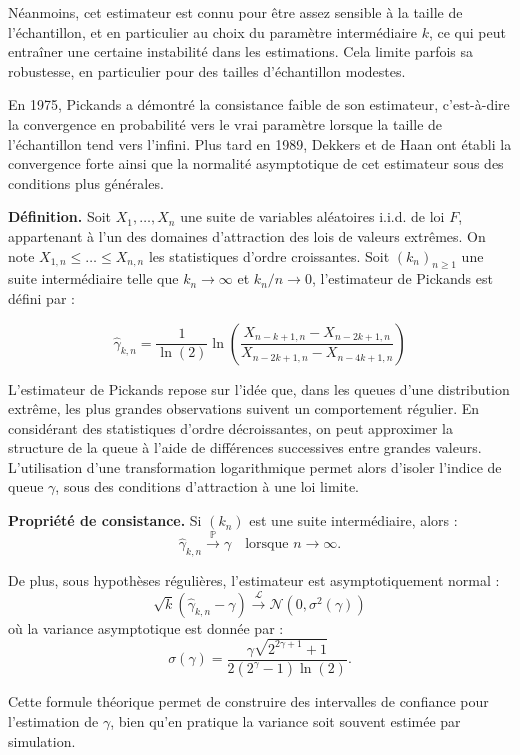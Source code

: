 \documentclass{article}
\theoremstyle{plain}
\theoremstyle{definition}
\theoremstyle{plain}
\begin{document}
Néanmoins, cet estimateur est connu pour être assez sensible à la taille de l’échantillon, et en particulier au choix du paramètre intermédiaire \(k\), ce qui peut entraîner une certaine instabilité dans les estimations. Cela limite parfois sa robustesse, en particulier pour des tailles d’échantillon modestes.

En 1975, Pickands a démontré la consistance faible de son estimateur, c’est-à-dire la convergence en probabilité vers le vrai paramètre lorsque la taille de l’échantillon tend vers l’infini. Plus tard en 1989, Dekkers et de Haan ont établi la convergence forte ainsi que la normalité asymptotique de cet estimateur sous des conditions plus générales.

\medskip
\textbf{Définition.} Soit \(X_1, \dots, X_n\) une suite de variables aléatoires i.i.d. de loi \(F\), appartenant à l’un des domaines d’attraction des lois de valeurs extrêmes. On note \(X_{1,n} \leq \dots \leq X_{n,n}\) les statistiques d’ordre croissantes. Soit \((k_n)_{n \geq 1}\) une suite intermédiaire telle que \(k_n \to \infty\) et \(k_n / n \to 0\), l’estimateur de Pickands est défini par :

\[
\hat{\gamma}_{k,n} = \frac{1}{\ln(2)} \ln\left( \frac{X_{n-k+1,n} - X_{n-2k+1,n}}{X_{n-2k+1,n} - X_{n-4k+1,n}} \right)
\]

\medskip
L’estimateur de Pickands repose sur l’idée que, dans les queues d’une distribution extrême, les plus grandes observations suivent un comportement régulier. En considérant des statistiques d’ordre décroissantes, on peut approximer la structure de la queue à l’aide de différences successives entre grandes valeurs. L’utilisation d’une transformation logarithmique permet alors d’isoler l’indice de queue \(\gamma\), sous des conditions d’attraction à une loi limite.

\medskip
\textbf{Propriété de consistance.} Si \((k_n)\) est une suite intermédiaire, alors :
\[
\hat{\gamma}_{k,n} \xrightarrow{\mathbb{P}} \gamma
\quad \text{lorsque } n \to \infty.
\]

De plus, sous hypothèses régulières, l’estimateur est asymptotiquement normal :
\[
\sqrt{k} \left( \hat{\gamma}_{k,n} - \gamma \right) \xrightarrow{\mathcal{L}} \mathcal{N}(0, \sigma^2(\gamma))
\]
où la variance asymptotique est donnée par :
\[
\sigma(\gamma) = \frac{\gamma \sqrt{2^{2\gamma + 1} + 1}}{2(2^{\gamma} - 1)\ln(2)}.
\]

\medskip
Cette formule théorique permet de construire des intervalles de confiance pour l’estimation de \(\gamma\), bien qu’en pratique la variance soit souvent estimée par simulation.
\end{document}
